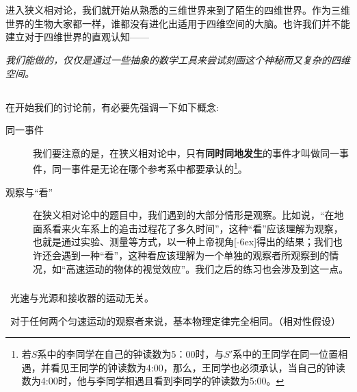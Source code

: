 \chapter[狭义相对论]{}
进入狭义相对论，我们就开始从熟悉的三维世界来到了陌生的四维世界。作为三维世界的生物大家都一样，谁都没有进化出适用于四维空间的大脑。也许我们并不能建立对于四维世界的直观认知——\begin{center}
	\itshape 我们能做的，仅仅是通过一些抽象的数学工具来尝试刻画这个神秘而又复杂的四维空间。
\end{center}
\section[相对论运动学]{}
在开始我们的讨论前，有必要先强调一下如下概念:
\begin{description}
	\item[同一事件] 我们要注意的是，在狭义相对论中，只有\textbf{同时同地发生}的事件才叫做同一事件，同一事件是无论在哪个参考系中都要承认的\footnote{\eg 若$S$系中的李同学在自己的钟读数为5：00时，与$S'$系中的王同学在同一位置相遇，并看见王同学的钟读数为4:00，那么，王同学也必须承认，当自己的钟读数为4:00时，他与李同学相遇且看到李同学的钟读数为5:00。}。
	\item[观察与“看”] 在狭义相对论中的题目中，我们遇到的大部分情形是观察。比如说，“在地面系看来火车系上的追击过程花了多久时间”，这种“看”应该理解为观察，也就是通过实验、测量等方式，以一种上帝视角[-6ex]得出的结果；我们也许还会遇到一种“看”，这种看应该理解为一个单独的观察者所观察到的情况，如“高速运动的物体的视觉效应”。我们之后的练习也会涉及到这一点。
\end{description}
\subsection[基本假设]{}

\begin{Itemize}
    \item {}\ 光速与光源和接收器的运动无关。
    \item {}\ 对于任何两个匀速运动的观察者来说，基本物理定律完全相同。（相对性假设）
\end{Itemize}

